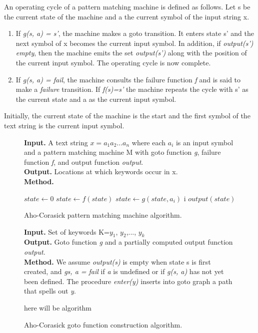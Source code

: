 \documentclass[thesis=M,english]{FITthesis}[2011/07/15]
\begin{document}
An operating cycle of a pattern matching machine is defined as follows. Let s be the current state of the machine and a the current symbol of the input string x.
\begin{enumerate}
\item If \emph{g(s, a) = s'}, the machine makes a goto transition. It enters state s' and the next symbol of x becomes the current input symbol.
In addition, if  \emph{output(s')  empty}, then the machine emits the set \emph{output(s')} along with the position of the current input symbol. The operating cycle is now complete.
\item If \emph{g(s, a) = fail}, the machine consults the failure function \emph{f} and is said to make a \emph{failure} transition. If \emph{f(s)=s'} the machine repeats the cycle with s' as the current state and a as the current input symbol.
\end{enumerate}
Initially, the current state of the machine is the start and the first symbol of the text string is the current input symbol. 

\begin{figure}[h]
\textbf{Input.} A text string $x = a_1 a_2 ... a_n$ where each $a_i$ is an input symbol and a pattern matching machine M with goto function \emph{g}, failure function \emph{f}, and output function \emph{output}.\\
\textbf{Output.} Locations at which keywords occur in x.\\
\textbf{Method.}
\begin{algorithmic}
\STATE $state \leftarrow 0$
\STATE $state \leftarrow f(state)$
\ENDWHILE
\STATE $state \leftarrow g(state, a_i)$
\PRINT i
\PRINT $output(state)$
\ENDIF
\ENDFOR
\end{algorithmic}
\caption{Aho-Corasick pattern matching machine algorithm.}
\label{fig:ac_search_pseudocode}
\end{figure}

\begin{figure}[h]
\textbf{Input.} Set of keywords K={$y_1$, $y_2$,..., $y_k$} \\
\textbf{Output.} Goto function \emph{g} and a partially computed output function \emph{output}.\\
\textbf{Method.} We assume \emph{output(s)} is empty when state s is first created, and \emph{g{s, a} = fail} if \emph{a} is undefined or if \emph{g(s, a)} has not yet been defined. The procedure \emph{enter(y)} inserts into goto graph a path that spells out \emph{y}.
\begin{algorithmic}
\PRINT here will be algorithm
\end{algorithmic}
\caption{Aho-Corasick goto function construction algorithm.}
\label{fig:ac_goto_pseudocode}
\end{figure}
\end{document}
